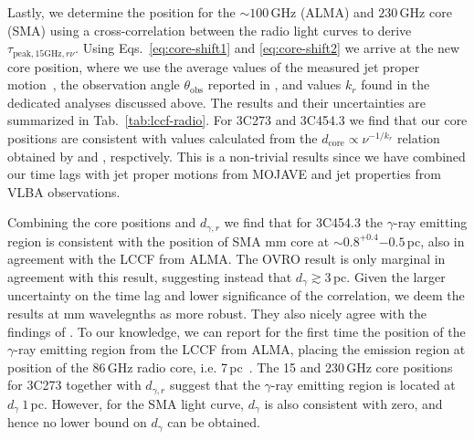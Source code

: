 \documentclass[twocolumn,linenumbers]{aastex62}
\newcommand{\gray}{$\gamma$-ray\xspace}
\begin{document}
Lastly, we determine the position for the $\sim100$\,GHz (ALMA) and $230\,$GHz core (SMA) using a cross-correlation between the radio light curves to derive $\tau_{\mathrm{peak},15\mathrm{GHz},r\nu}$.
Using Eqs.~\ref{eq:core-shift1} and \ref{eq:core-shift2} we arrive at the new core position, where we use the average values of the measured jet proper motion~\citep[see Table 4 in][]{2016AJ....152...12L}, the observation angle $\theta_\mathrm{obs}$ reported in \citet{2017ApJ...846...98J},
and values $k_r$ found in the dedicated analyses discussed above. 
The results and their uncertainties are summarized in Tab.~\ref{tab:lccf-radio}.
For 3C273 and 3C454.3 we find that our core positions are consistent with values calculated from the $d_\mathrm{core}\propto\nu^{-1/k_r}$ relation obtained by \citet{2013ARep...57...34V} and \citet{2014MNRAS.437.3396K}, respctively. 
This is a non-trivial results since we have combined our time lags with jet proper motions from MOJAVE and jet properties from VLBA observations. 

Combining the core positions and $d_{\gamma,r}$ we find that for 3C454.3 the \gray emitting region is consistent with the position of SMA mm core at $\sim 0.8^{+0.4}{-0.5}$\,pc, also in agreement with the LCCF from ALMA. The OVRO result is only marginal in agreement with this result, suggesting instead that $d_\gamma \gtrsim 3\,$pc.
Given the larger uncertainty on the time lag and lower significance of the correlation, we deem the results at mm wavelegnths as more robust. 
They also nicely agree with the findings of \citet{2014MNRAS.441.1899F}.
To our knowledge, we can report for the first time 
the position of the \gray emitting region from the LCCF from ALMA, placing the emission region at position of the 86\,GHz radio core, i.e. 7\,pc~\citep{2015A&A...576A..43F}.
The 15 and 230\,GHz core positions for 3C273 together with $d_{\gamma,r}$ suggest that the \gray emitting region is located at $d_\gamma~1\,$pc. However, for the SMA light curve, $d_\gamma$ is also consistent with zero, and hence no lower bound on $d_\gamma$ can be obtained. 
\end{document}
